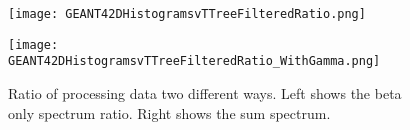\documentclass[../MaxHughesThesis.tex]{subfiles}
\begin{document}
\begin{figure}
    \centering
    \begin{minipage}{0.50\textwidth}
        \centerline{\texttt{[image: GEANT42DHistogramsvTTreeFilteredRatio.png]}}
    \end{minipage}\hfill
    \begin{minipage}{0.50\textwidth}
        \centerline{\texttt{[image: GEANT42DHistogramsvTTreeFilteredRatio\_WithGamma.png]}}
    \end{minipage}
    \caption{Ratio of processing data two different ways.
	     Left shows the beta only spectrum ratio.
	     Right shows the sum spectrum.}
    \label{fig:histogramtottreeratio}
\end{figure}
\end{document}
